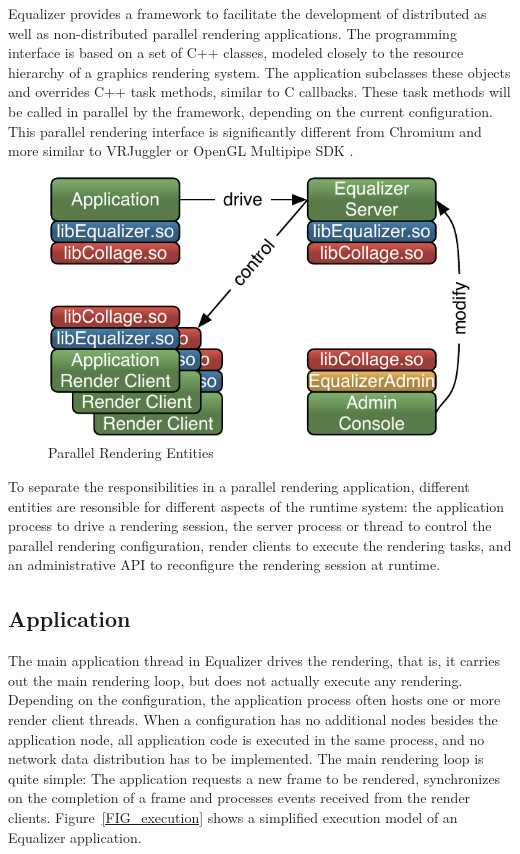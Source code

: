 Equalizer provides a framework to facilitate the development of distributed as
well as non-distributed parallel rendering applications. The programming
interface is based on a set of C++ classes, modeled closely to the resource
hierarchy of a graphics rendering system. The application subclasses these
objects and overrides C++ task methods, similar to C callbacks. These task
methods will be called in parallel by the framework, depending on the current
configuration. This parallel rendering interface is significantly different from
Chromium \cite{HHNFAKK:02} and more similar to VRJuggler \cite{BJHMBC:01} or
OpenGL Multipipe SDK \cite{BRE:05}.

\begin{figure}
  \includegraphics[width=.618\textwidth]{images/processes}
  {\caption{\label{fProcessing}Parallel Rendering Entities}}
\end{figure}

To separate the responsibilities in a parallel rendering application, different
entities are resonsible for different aspects of the runtime system: the
application process to drive a rendering session, the server process or thread
to control the parallel rendering configuration, render clients to execute the
rendering tasks, and an administrative API to reconfigure the rendering session
at runtime.

\subsection{Application}

The main application thread in Equalizer drives the rendering, that is, it
carries out the main rendering loop, but does not actually execute any
rendering. Depending on the configuration, the application process often hosts
one or more render client threads. When a configuration has no additional nodes
besides the application node, all application code is executed in the same
process, and no network data distribution has to be implemented. The main
rendering loop is quite simple: The application requests a new frame to be
rendered, synchronizes on the completion of a frame and processes events
received from the render clients. Figure~\ref{FIG_execution} shows a simplified
execution model of an Equalizer application.


